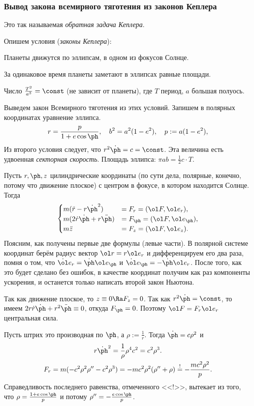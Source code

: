 \documentclass[a4paper,12pt]{article}
\def\F{\ol F}
\def\r{\ol r}
\def\e{\ol e}
\def\dd{\ddot}
\def\d{\dot}
\newcommand{\ez}{\equiv0}
\begin{document}
\subsubsection{Вывод закона всемирного тяготения из законов Кеплера}

Это так называемая \emph{обратная задача Кеплера}.

Опишем условия (\emph{законы Кеплера}):
\begin{nums}{-2}
\item Планеты движутся по эллипсам, в одном из фокусов Солнце.
\item За одинаковое время планеты заметают в эллипсах равные площади.
\item Число $\frac{T^2}{a^3}=\const$ (не зависит от планеты), где $T$ период, $a$ большая полуось.
\end{nums}

Выведем закон Всемирного тяготения из этих условий. Запишем в полярных
координатах уравнение эллипса.
$$
r=\frac{p}{1+e\cos \ph},\quad b^2=a^2(1-e^2),\quad p:=a(1-e^2),
$$
Из второго условия следует, что $r^2\d\ph=c=\const$. Эта величина есть удвоенная \emph{секторная скорость}.
Площадь эллипса: $\pi ab=\frac12 c\cdot T$.

Пусть $r,\ph,z$ цилиндрические координаты (по сути дела, полярные, конечно, потому что движение плоское)
с центром в фокусе, в котором находится Солнце. Тогда
$$
\begin{cases}
m(\dd r-r\d\ph^2)&=F_r=(\ol F,\e_r),\\
m(2\d r\d \ph+r\dd \ph)&=F_{\ph}=(\ol F,\e_\ph),\\
m\dd z&=F_z=(\ol F,\e_z).
\end{cases}
$$
Поясним, как получены первые две формулы (левые части). В полярной системе координат
берём радиус вектор $\r = r \e_r$ и дифференцируем его два раза, помня о том, что
$\d\e_r = \d\ph\e_\ph$ и $\d\e_\ph = -\d\ph \e_r$. После того, как это будет сделано без
ошибок, в качестве координат получим как раз компоненты ускорения, и останется только написать второй
закон Ньютона.

Так как движение плоское, то $z\ez\Ra F_z=0$. Так как
$r^2\d\ph=\const$, то имеем $2r\d r\d\ph+r^2\dd \ph\ez$, откуда
$F_\ph=0$. Поэтому $\F=F_r\e_r$ центральная сила.

Пусть штрих это производная по $\ph$, а $\rho:=\frac1r$. Тогда $\d\ph = c\rho^2$ и\label{page:KeplerReverse}
\eqn{\label{eqn:KeplerReverse}
\begin{aligned}
\d r&=\frac{d}{dt}\frac1{\rho}=-\frac{\d\rho}{\rho^2}=-\frac{\rho'\d\ph}{\rho^2}=-\rho'c.\\
\dd r&=(\d r)'\d\ph=-c\rho''(c\rho^2)=-c^2\rho^2\rho''.
\end{aligned}}
\begin{gather*}
r\d\ph^2=\frac1\rho\rho^4c^2=c^2\rho^3.\\
F_r=m(-c^2\rho^2\rho''-c^2\rho^3)=-mc^2\rho^2(\rho''+\rho)\stackrel{!}{=}-\frac{mc^2\rho^2}{p}.
\end{gather*}
Справедливость последнего равенства, отмеченного <<!>>, вытекает из
того, что $\rho=\frac{1+e\cos\ph}{p}$ и потому $\rho''=-\frac{e\cos \ph}{p}$.
\end{document}
